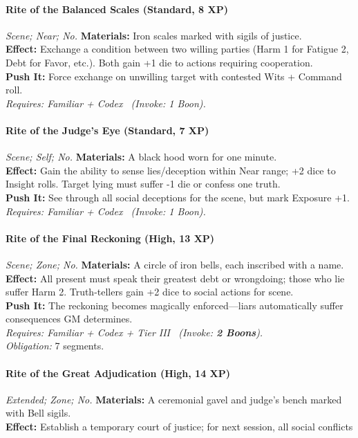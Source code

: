 \paragraph{Rite of the Balanced Scales (Standard, 8 XP)} \emph{Scene; Near; No.}
\textbf{Materials:} Iron scales marked with sigils of justice. \\
\textbf{Effect:} Exchange a condition between two willing parties (Harm 1 for Fatigue 2, Debt for Favor, etc.). Both gain +1 die to actions requiring cooperation. \\
\textbf{Push It:} Force exchange on unwilling target with contested Wits + Command roll. \\
\emph{Requires: Familiar + Codex \ (\textit{Invoke:} 1 Boon).}

\paragraph{Rite of the Judge's Eye (Standard, 7 XP)} \emph{Scene; Self; No.}
\textbf{Materials:} A black hood worn for one minute. \\
\textbf{Effect:} Gain the ability to sense lies/deception within Near range; +2 dice to Insight rolls. Target lying must suffer -1 die or confess one truth. \\
\textbf{Push It:} See through all social deceptions for the scene, but mark Exposure +1. \\
\emph{Requires: Familiar + Codex \ (\textit{Invoke:} 1 Boon).}

\paragraph{Rite of the Final Reckoning (High, 13 XP)} \emph{Scene; Zone; No.}
\textbf{Materials:} A circle of iron bells, each inscribed with a name. \\
\textbf{Effect:} All present must speak their greatest debt or wrongdoing; those who lie suffer Harm 2. Truth-tellers gain +2 dice to social actions for scene. \\
\textbf{Push It:} The reckoning becomes magically enforced—liars automatically suffer consequences GM determines. \\
\emph{Requires: Familiar + Codex + Tier III \ (\textit{Invoke:} \textbf{2 Boons}).} \\
\emph{Obligation:} 7 segments.

\paragraph{Rite of the Great Adjudication (High, 14 XP)} \emph{Extended; Zone; No.}
\textbf{Materials:} A ceremonial gavel and judge's bench marked with Bell sigils. \\
\textbf{Effect:} Establish a temporary court of justice; for next session, all social conflicts